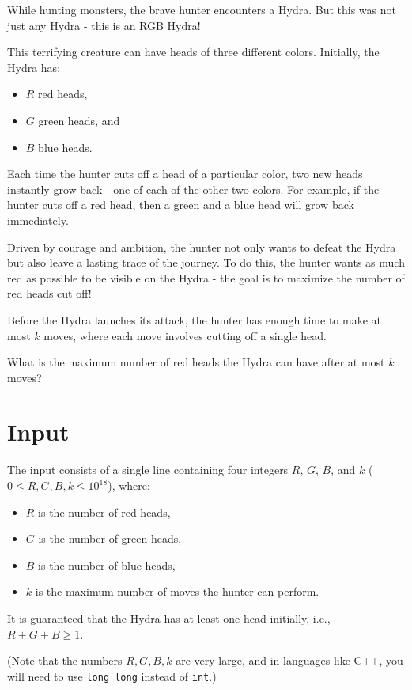\noindent
While hunting monsters, the brave hunter encounters a Hydra. But this was not just any Hydra - this is an RGB Hydra!

This terrifying creature can have heads of three different colors. Initially, the Hydra has:
\begin{itemize}
    \item $R$ red heads,
    \item $G$ green heads, and
    \item $B$ blue heads.
\end{itemize}

Each time the hunter cuts off a head of a particular color, two new heads instantly grow back - one of
each of the other two colors. For example, if the hunter cuts off a red head, then a green and a blue
head will grow back immediately.

Driven by courage and ambition, the hunter not only wants to defeat the Hydra but also leave a
lasting trace of the journey. To do this, the hunter wants as much red as possible to be visible
on the Hydra - the goal is to maximize the number of red heads cut off!

Before the Hydra launches its attack, the hunter has enough time to make at most $k$ moves,
where each move involves cutting off a single head.

What is the maximum number of red heads the Hydra can have after at most $k$ moves?

\section*{Input}
The input consists of a single line containing four integers $R$, $G$, $B$, and
$k$ ($0 \leq R, G, B, k \leq 10^{18}$), where:
\begin{itemize}
    \item $R$ is the number of red heads,
    \item $G$ is the number of green heads,
    \item $B$ is the number of blue heads,
    \item $k$ is the maximum number of moves the hunter can perform.
\end{itemize}

It is guaranteed that the Hydra has at least one head initially, i.e., $R + G + B \geq 1$.

(Note that the numbers $R, G, B, k$ are very large, and in languages like C++, you will need to
use \texttt{long long} instead of \texttt{int}.)

